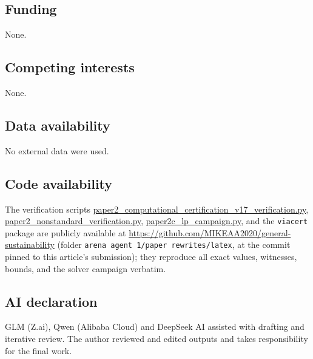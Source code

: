 \documentclass[10pt,twocolumn]{article}
\theoremstyle{plain}
\theoremstyle{definition}
\theoremstyle{remark}
\begin{document}
\subsection*{Funding}
None.

\subsection*{Competing interests}
None.

\subsection*{Data availability}
No external data were used.

\subsection*{Code availability}
The verification scripts
\url{paper2_computational_certification_v17_verification.py},
\url{paper2_nonstandard_verification.py},
\url{paper2c_lp_campaign.py}, and the \texttt{viacert} package are publicly
available at \url{https://github.com/MIKEAA2020/general-sustainability}
(folder \texttt{arena agent 1/paper rewrites/latex}, at the commit
pinned to this article's submission); they reproduce all exact values,
witnesses, bounds, and the solver campaign verbatim.

\subsection*{AI declaration}
GLM (Z.ai), Qwen (Alibaba Cloud) and DeepSeek AI assisted with drafting
and iterative review. The author reviewed and edited outputs and takes
responsibility for the final work.
\end{document}
